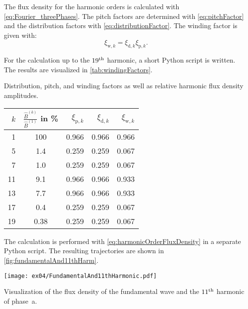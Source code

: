 \begin{solutionblock}
    The flux density for the harmonic orders is calculated with \eqref{eq:Fourier_threePhases}. The pitch factors are determined with \eqref{eq:pitchFactor} and the distribution factors with \eqref{eq:distributionFactor}. The winding factor is given with:
    \begin{equation}
        \xi_{\mathrm{w,}k} = \xi_{\mathrm{d,}k} \xi_{\mathrm{p,}k}.
    \end{equation}

    For the calculation up to the $19\textsuperscript{th}$ harmonic, a short Python script is written.
    The results are visualized in \autoref{tab:windingFactors}.
    \begin{solutiontable}[ht]
        \caption{Distribution, pitch, and winding factors as well as relative harmonic flux density  amplitudes.}
        \centering
        \begin{tabular}{rcrrr}\toprule
        $k$ & $\frac{\hat{B}^{(k)}}{\hat{B}^{(1)}}$ in \%   & $\xi_{\mathrm{p,}k}$  & $\xi_{\mathrm{d,}k}$ & $\xi_{\mathrm{w,}k}$\\
        \midrule
        1   & 100   & 0.966 & 0.966 & 0.966 \\
        5   & 1.4   & 0.259 & 0.259 & 0.067 \\
        7   & 1.0   & 0.259 & 0.259 & 0.067 \\
        11  & 9.1   & 0.966 & 0.966 & 0.933 \\
        13  & 7.7   & 0.966 & 0.966 & 0.933 \\
        17  & 0.4   & 0.259 & 0.259 & 0.067 \\
        19  & 0.38  & 0.259 & 0.259 & 0.067 \\
        \bottomrule
        \end{tabular}
        \label{tab:windingFactors}
    \end{solutiontable}

\end{solutionblock}


\begin{solutionblock}
    The calculation is performed with \eqref{eq:harmonicOrderFluxDensity} in a separate Python script. The resulting trajectories are shown in \autoref{fig:fundamentalAnd11thHarm}.
    \begin{solutionfigure}[ht]
        \centering
        \texttt{[image: ex04/FundamentalAnd11thHarmonic.pdf]}
        \caption{Visualization of the flux density of the fundamental wave and the $11\textsuperscript{th}$ harmonic of phase~a.}
        \label{fig:fundamentalAnd11thHarm}
    \end{solutionfigure}    

\end{solutionblock}




